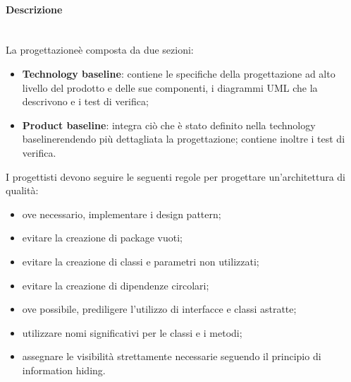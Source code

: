 \paragraph*{Descrizione}\mbox{}\\ [1mm]
La progettazione\glosp è composta da due sezioni:
\begin{itemize}
	\item \textbf{Technology baseline\glo}: contiene le specifiche della progettazione ad alto livello del prodotto e delle sue componenti, i diagrammi UML che la descrivono e i test di verifica;
	\item \textbf{Product baseline\glo}: integra ciò che è stato definito nella technology baseline\glosp rendendo più dettagliata la progettazione; contiene inoltre i test di verifica.	
\end{itemize}
I progettisti devono seguire le seguenti regole per progettare un'architettura di qualità:
\begin{itemize}
	\item ove necessario, implementare i design pattern\glo;
	\item evitare la creazione di package vuoti;
	\item evitare la creazione di classi e parametri non utilizzati;
	\item evitare la creazione di dipendenze circolari;
	\item ove possibile, prediligere l'utilizzo di interfacce e classi astratte;
	\item utilizzare nomi significativi per le classi e i metodi;
	\item assegnare le visibilità strettamente necessarie seguendo il principio di information hiding.
\end{itemize}

